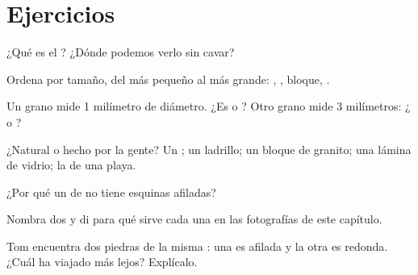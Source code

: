 \section{Ejercicios}

\begin{exercise}[$\star$]\label{exo:g3:stones-pebbles-sand:1}
¿Qué es el ? ¿Dónde podemos verlo sin cavar?
\end{exercise}

\begin{exercise}[$\star$]\label{exo:g3:stones-pebbles-sand:2}
Ordena por tamaño, del más pequeño al más grande: , ,
bloque, .
\end{exercise}

\begin{exercise}[$\star$]\label{exo:g3:stones-pebbles-sand:3}
Un grano mide 1 milímetro de diámetro. ¿Es  o ? Otro grano mide
3 milímetros: ¿ o ?
\end{exercise}

\begin{exercise}[$\star$]\label{exo:g3:stones-pebbles-sand:4}
¿Natural o hecho por la gente? Un ; un ladrillo; un bloque de
granito; una lámina de vidrio; la  de una playa.
\end{exercise}

\begin{exercise}[$\star$]\label{exo:g3:stones-pebbles-sand:5}
¿Por qué un  de  no tiene esquinas afiladas?
\end{exercise}

\begin{exercise}[$\star$]\label{exo:g3:stones-pebbles-sand:6}
Nombra dos  y di para qué sirve cada una en las
fotografías de este capítulo.
\end{exercise}

\begin{exercise}[$\star\star$]\label{exo:g3:stones-pebbles-sand:7}
Tom encuentra dos piedras de la misma : una es afilada y la otra es
redonda. ¿Cuál ha viajado más lejos? Explícalo.
\end{exercise}

